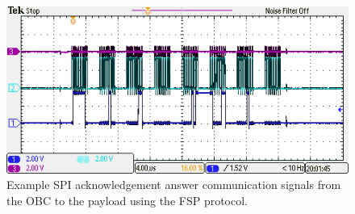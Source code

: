 \begin{figure}[!ht]
    \begin{center}
        \includegraphics[width=1\textwidth]{figures/fsp_ack_out.png}
        \caption{Example SPI acknowledgement answer communication signals from the OBC to the payload using the FSP protocol.}
        \label{fig:sig_ack_out}
    \end{center}
\end{figure}




\clearpage